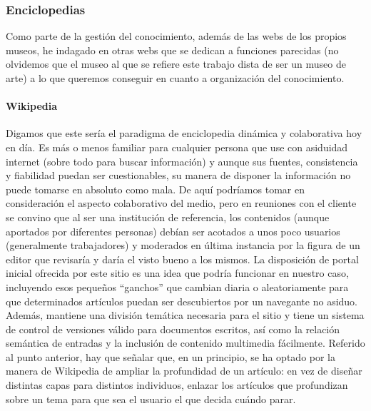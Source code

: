 
\subsubsection{Enciclopedias}

\par Como parte de la gestión del conocimiento, además de las webs de los propios museos, he indagado en otras webs que se dedican a funciones parecidas (no olvidemos que el museo al que se refiere este trabajo dista de ser un museo de arte) a lo que queremos conseguir en cuanto a organización del conocimiento.

\paragraph{Wikipedia}
\par Digamos que este sería el paradigma de enciclopedia dinámica y colaborativa hoy en día. Es más o menos familiar para cualquier persona que use con asiduidad internet (sobre todo para buscar información) y aunque sus fuentes, consistencia y fiabilidad puedan ser cuestionables, su manera de disponer la información no puede tomarse en absoluto como mala. De aquí podríamos tomar en consideración el aspecto colaborativo del medio, pero en reuniones con el cliente se convino que al ser una institución de referencia, los contenidos (aunque aportados por diferentes personas) debían ser acotados a unos poco usuarios (generalmente trabajadores) y moderados en última instancia por la figura de un editor que revisaría y daría el visto bueno a los mismos.
La disposición de portal inicial ofrecida por este sitio es una idea que podría funcionar en nuestro caso, incluyendo esos pequeños ``ganchos'' que cambian diaria o aleatoriamente para que determinados artículos puedan ser descubiertos por un navegante no asiduo. Además, mantiene una división temática necesaria para el sitio y tiene un sistema de control de versiones válido para documentos escritos, así como la relación semántica de entradas y la inclusión de contenido multimedia fácilmente.
Referido al punto anterior, hay que señalar que, en un principio, se ha optado por la manera de Wikipedia de ampliar la profundidad de un artículo: en vez de diseñar distintas capas para distintos individuos, enlazar los artículos que profundizan sobre un tema para que sea el usuario el que decida cuándo parar.


